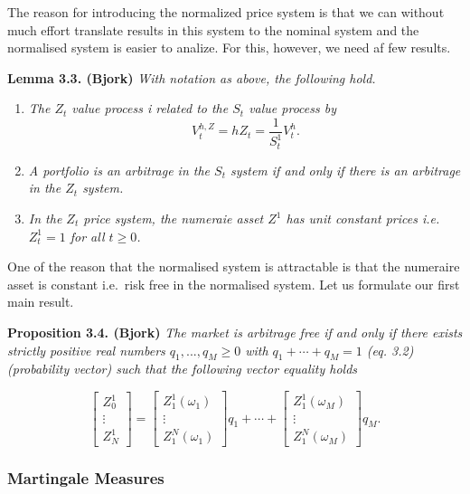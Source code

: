 \documentclass[a4paper,12pt,openany]{book}
\providecommand{\tightlist}{%
 \setlength{\itemsep}{0pt}\setlength{\parskip}{0pt}}
\begin{document}
The reason for introducing the normalized price system is that we can without much effort translate results in this system to the nominal system and the normalised system is easier to analize. For this, however, we need af few results.

\textbf{Lemma 3.3. (Bjork)} \emph{With notation as above, the following hold.}

\begin{enumerate}
\def\labelenumi{\arabic{enumi}.}
\tightlist
\item
  \emph{The \(Z_t\) value process i related to the \(S_t\) value process by}
  \[
    V_t^{h,Z}=hZ_t=\frac{1}{S_t^1}V_t^h.
    \]
\item
  \emph{A portfolio is an arbitrage in the \(S_t\) system if and only if there is an arbitrage in the \(Z_t\) system.}
\item
  \emph{In the \(Z_t\) price system, the numeraie asset \(Z^1\) has unit constant prices i.e.~\(Z_t^1=1\) for all \(t\ge 0\).}
\end{enumerate}

One of the reason that the normalised system is attractable is that the numeraire asset is constant i.e.~risk free in the normalised system. Let us formulate our first main result.

\textbf{Proposition 3.4. (Bjork)} \emph{The market is arbitrage free if and only if there exists strictly positive real numbers \(q_1,...,q_M\ge 0\) with \(q_1+\cdots + q_M=1\) (eq. 3.2) (probability vector) such that the following vector equality holds}

\[
\begin{bmatrix} Z_0^1\\
\vdots\\
Z_N^1\end{bmatrix}=\begin{bmatrix} Z_1^1(\omega_1)\\
\vdots\\
Z_1^N(\omega_1)\end{bmatrix}q_1+\cdots +\begin{bmatrix} Z_1^1(\omega_M)\\
\vdots\\
Z_1^N(\omega_M)\end{bmatrix}q_M.\tag{3.3}
\]

\hypertarget{martingale-measures}{%
\subsubsection{Martingale Measures}\label{martingale-measures}}
\end{document}
